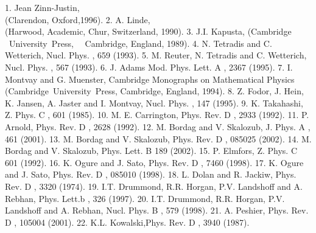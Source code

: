 \documentclass[a4paper,12pt]{article}
\begin{document}
\begin{thebibliography}{40}

 1. Jean Zinn-Justin, \coordHE{}\\(Clarendon, Oxford,1996).
 2. A. Linde,
  \coordHE{}\\
(Harwood, Academic, Chur, Switzerland, 1990).
 3. J.I. Kapusta,
  \coordHE{}(Cambridge
~University~Press,~~  Cambridge, England, 1989). 
 4. N. Tetradis and C. Wetterich,
  Nucl. Phys. \coordHE{}, 659 (1993).
 5. M. Reuter, N. Tetradis and C. Wetterich,
  Nucl. Phys. \coordHE{}, 567 (1993).
 6. J. Adams \coordHE{} Mod. Phys. Lett. A \coordHE{},
  2367 (1995).
 7. I. Montvay and G. Muenster, \coordHE{} Cambridge Monographs on Mathematical Physics
  (Cambridge~University~Press, Cambridge, England, 1994).
 8. Z. Fodor, J. Hein, K. Jansen, A. Jaster and
  I. Montvay, Nucl. Phys. \coordHE{}, 147 (1995).
 9. K. Takahashi, Z. Phys. C \coordHE{}, 601 (1985).
 10. M. E. Carrington, Phys. Rev. D \coordHE{},
  2933 (1992).
 11. P. Arnold, Phys. Rev. D \coordHE{},
  2628 (1992).
 12. M. Bordag and V. Skalozub, J. Phys. A \coordHE{},
  461 (2001).
 13. M. Bordag and V. Skalozub, Phys. Rev. D \coordHE{},
  085025 (2002).
 14. M. Bordag and V. Skalozub, Phys. Lett. B
  \coordHE{} 189 (2002).
 15. P. Elmfors, Z. Phys. C \coordHE{} 601 (1992).
 16. K. Ogure and J. Sato, Phys. Rev. D \coordHE{}, 7460
  (1998).
 17. K. Ogure and J. Sato, Phys. Rev. D \coordHE{}, 085010
  (1998).
 18. L. Dolan and R. Jackiw,  Phys. Rev. D \coordHE{}, 3320
  (1974).
 19. I.T. Drummond, R.R. Horgan, P.V. Landshoff and
  A. Rebhan, Phys. Lett.b \coordHE{}, 326 (1997).
 20. I.T. Drummond, R.R. Horgan, P.V. Landshoff and
  A. Rebhan, Nucl. Phys. B \coordHE{}, 579 (1998).
 21. A. Peshier, Phys. Rev. D \coordHE{}, 105004
  (2001).
 22. K.L. Kowalski,Phys. Rev. D \coordHE{}, 3940
  (1987).
\end{thebibliography}
\end{document}
